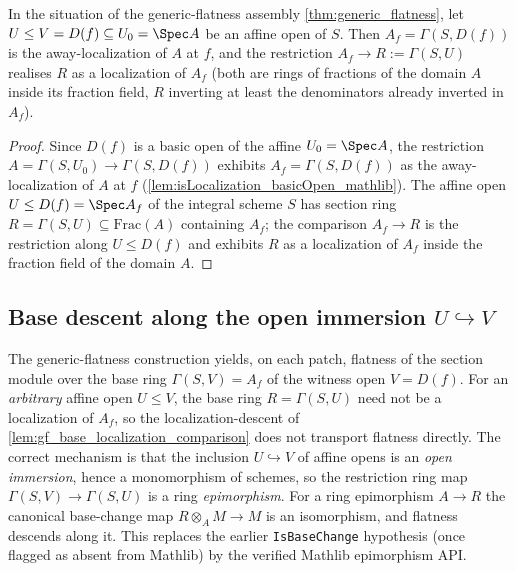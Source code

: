\begin{lemma}
  \label{lem:gf_base_localization_comparison}
  In the situation of the generic-flatness assembly \cref{thm:generic_flatness}, let
  \(U \le V = D(f) \subseteq U_0 = \Spec A\)
  be an affine open of \(S\). Then \(A_f = \Gamma(S, D(f))\) is the away-localization of \(A\) at
  \(f\), and the restriction \(A_f \to R := \Gamma(S, U)\) realises \(R\) as a localization of \(A_f\)
  (both are rings of fractions of the domain \(A\) inside its fraction field, \(R\) inverting at least
  the denominators already inverted in \(A_f\)).
\end{lemma}

\begin{proof}
  \leanok
  Since \(D(f)\) is a basic open of the affine \(U_0 = \Spec A\), the restriction
  \(A = \Gamma(S, U_0) \to \Gamma(S, D(f))\) exhibits \(A_f = \Gamma(S, D(f))\) as the
  away-localization of \(A\) at \(f\) (\cref{lem:isLocalization_basicOpen_mathlib}). The affine open
  \(U \le D(f) = \Spec A_f\) of the integral scheme \(S\) has section ring
  \(R = \Gamma(S, U) \subseteq \mathrm{Frac}(A)\) containing \(A_f\); the comparison
  \(A_f \to R\) is the restriction along \(U \le D(f)\) and exhibits \(R\) as a localization of
  \(A_f\) inside the fraction field of the domain \(A\).
\end{proof}

\subsection{Base descent along the open immersion \(U \hookrightarrow V\)}
\label{sec:gf_base_descent_isEpi}

The generic-flatness construction yields, on each patch, flatness of the section module
over the base ring \(\Gamma(S, V) = A_f\) of the witness open \(V = D(f)\). For an
\emph{arbitrary} affine open \(U \le V\), the base ring \(R = \Gamma(S, U)\) need not be a
localization of \(A_f\), so the localization-descent of
\cref{lem:gf_base_localization_comparison} does not transport flatness directly. The correct
mechanism is that the inclusion \(U \hookrightarrow V\) of affine opens is an \emph{open
immersion}, hence a monomorphism of schemes, so the restriction ring map
\(\Gamma(S, V) \to \Gamma(S, U)\) is a ring \emph{epimorphism}. For a ring epimorphism
\(A \to R\) the canonical base-change map \(R \otimes_A M \to M\) is an isomorphism, and
flatness descends along it. This replaces the earlier \texttt{IsBaseChange} hypothesis (once
flagged as absent from Mathlib) by the verified Mathlib epimorphism API.


